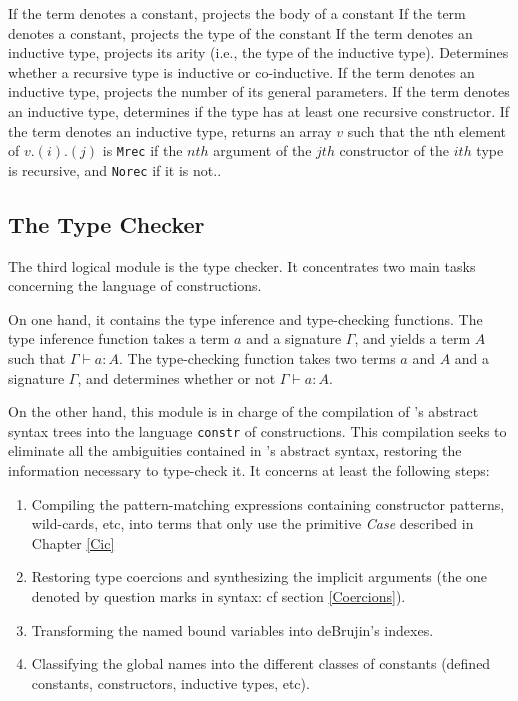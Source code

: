 \begin{description}
    {If the term denotes a constant, projects the body of a constant}
    {If the term denotes a constant, projects the type of the constant}
    {If the term denotes an inductive type, projects its arity (i.e.,
     the type of the inductive type).}
    {Determines whether a recursive type is inductive or co-inductive.}
    {If the term denotes an inductive type, projects the number of 
     its general parameters.}
    {If the term denotes an inductive type, 
     determines if the type has at least one recursive constructor. }
    {If the term denotes an inductive type, returns an array $v$ such 
     that the nth element of $v.(i).(j)$ is
    \texttt{Mrec} if the $nth$ argument of the $jth$ constructor of
    the $ith$ type is recursive, and \texttt{Norec} if it is not.}.
\end{description}

\subsection[The Type Checker]{The Type Checker\label{TypeChecker}}

The third logical module is the type checker. It concentrates two main
tasks concerning the language of constructions.

On one hand, it contains the type inference and type-checking
functions.  The type inference function takes a term
$a$ and a signature $\Gamma$, and yields a term $A$ such that
$\Gamma \vdash a:A$.  The type-checking function takes two terms $a$
and $A$ and a signature $\Gamma$, and determines whether or not
$\Gamma \vdash a:A$.

On the other hand, this module is in charge of the compilation of
\Coq's abstract syntax trees into the language \texttt{constr} of
constructions. This compilation seeks to eliminate all the ambiguities
contained in \Coq's abstract syntax, restoring the information
necessary to type-check it.  It concerns at least the following steps:
\begin{enumerate}
\item Compiling the pattern-matching expressions containing 
constructor patterns, wild-cards, etc, into terms that only
use the primitive \textsl{Case} described in Chapter \ref{Cic}
\item Restoring type coercions and synthesizing the implicit arguments
(the one denoted by question marks in
{\Coq} syntax: cf section \ref{Coercions}).
\item Transforming the named bound variables into deBrujin's indexes.
\item Classifying the global names into the different classes of
constants (defined constants, constructors, inductive types, etc).
\end{enumerate}


